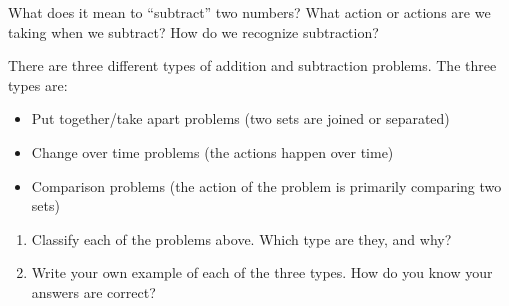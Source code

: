 \documentclass[nooutcomes,noauthor,handout]{ximera}
\begin{document}
\begin{problem}
What does it mean to ``subtract'' two numbers? What action or actions are we taking when we subtract? How do we recognize subtraction?
\end{problem}

\newpage



\begin{problem}
There are three different types of addition and subtraction problems. The three types are:
\begin{itemize}
\item Put together/take apart problems (two sets are joined or separated)
\item Change over time problems (the actions happen over time)
\item Comparison problems (the action of the problem is primarily comparing two sets)
\end{itemize}
\begin{enumerate}
	\item Classify each of the problems above. Which type are they, and why?
	\item Write your own example of each of the three types. How do you know your answers are correct?
\end{enumerate}
\end{problem}


%
\end{document}
